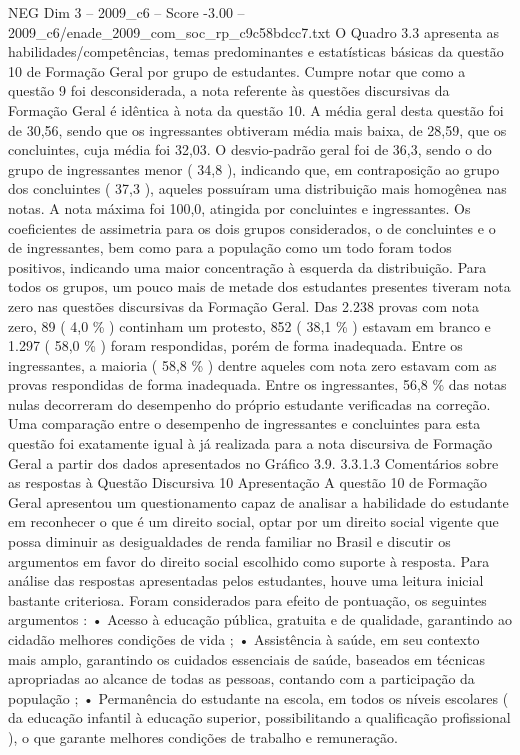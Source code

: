\begin{textsample}{NEG Dim 3 – 2009\_c6 – Score -3.00 – 2009\_c6/enade\_2009\_com\_soc\_rp\_c9c58bdcc7.txt}
O Quadro 3.3 apresenta as habilidades/competências, temas predominantes e estatísticas básicas da questão 10 de Formação Geral por grupo de estudantes.
Cumpre notar que como a questão 9 foi desconsiderada, a nota referente às questões discursivas da Formação Geral é idêntica à nota da questão 10.
A média geral desta questão foi de 30,56, sendo que os ingressantes obtiveram média mais baixa, de 28,59, que os concluintes, cuja média foi 32,03.
O desvio-padrão geral foi de 36,3, sendo o do grupo de ingressantes menor ( 34,8 ), indicando que, em contraposição ao grupo dos concluintes ( 37,3 ), aqueles possuíram uma distribuição mais homogênea nas notas.
A nota máxima foi 100,0, atingida por concluintes e ingressantes.
Os coeficientes de assimetria para os dois grupos considerados, o de concluintes e o de ingressantes, bem como para a população como um todo foram todos positivos, indicando uma maior concentração à esquerda da distribuição.
Para todos os grupos, um pouco mais de metade dos estudantes presentes tiveram nota zero nas questões discursivas da Formação Geral.
Das 2.238 provas com nota zero, 89 ( 4,0 \% ) continham um protesto, 852 ( 38,1 \% ) estavam em branco e 1.297 ( 58,0 \% ) foram respondidas, porém de forma inadequada.
Entre os ingressantes, a maioria ( 58,8 \% ) dentre aqueles com nota zero estavam com as provas respondidas de forma inadequada.
Entre os ingressantes, 56,8 \% das notas nulas decorreram do desempenho do próprio estudante verificadas na correção.
Uma comparação entre o desempenho de ingressantes e concluintes para esta questão foi exatamente igual à já realizada para a nota discursiva de Formação Geral a partir dos dados apresentados no Gráfico 3.9. 3.3.1.3 Comentários sobre as respostas à Questão Discursiva 10 Apresentação A questão 10 de Formação Geral apresentou um questionamento capaz de analisar a habilidade do estudante em reconhecer o que é um direito social, optar por um direito social vigente que possa diminuir as desigualdades de renda familiar no Brasil e discutir os argumentos em favor do direito social escolhido como suporte à resposta.
Para análise das respostas apresentadas pelos estudantes, houve uma leitura inicial bastante criteriosa.
Foram considerados para efeito de pontuação, os seguintes argumentos : • Acesso à educação pública, gratuita e de qualidade, garantindo ao cidadão melhores condições de vida ; • Assistência à saúde, em seu contexto mais amplo, garantindo os cuidados essenciais de saúde, baseados em técnicas apropriadas ao alcance de todas as pessoas, contando com a participação da população ; • Permanência do estudante na escola, em todos os níveis escolares ( da educação infantil à educação superior, possibilitando a qualificação profissional ), o que garante melhores condições de trabalho e remuneração.

\end{textsample}
